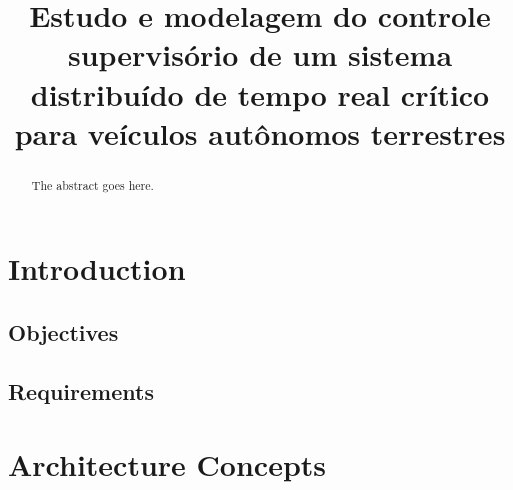\documentclass[conference]{IEEEtran}
\begin{document}
%
\title{Estudo e modelagem do controle supervisório de um sistema distribuído de tempo real crítico para veículos autônomos terrestres}

\author{
}

\maketitle

\begin{abstract}
The abstract goes here.
\end{abstract}


\IEEEpeerreviewmaketitle
\section{Introduction}\label{sec:introduction}
\subsection{Objectives}\label{subsec:objectives}
\subsection{Requirements}\label{subsec:requirements}
\section{Architecture Concepts}\label{sec:architec_concepts}
\end{document}
